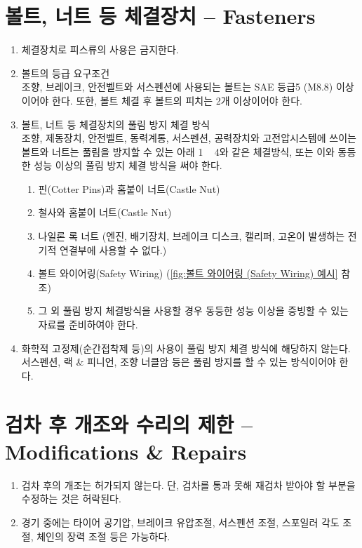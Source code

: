 \documentclass[final,a4paper,10pt]{report}
\begin{document}
\section{볼트, 너트 등 체결장치 – Fasteners} \label{section:체결장치}
\begin{enumerate}
  \item 체결장치로 피스류의 사용은 금지한다.
  \item 볼트의 등급 요구조건\\
    조향, 브레이크, 안전벨트와 서스펜션에 사용되는 볼트는 SAE 등급5 (M8.8) 이상이어야 한다. 또한, 볼트 체결 후 볼트의 피치는 2개 이상이어야 한다.
  \item 볼트, 너트 등 체결장치의 풀림 방지 체결 방식\\ \label{item:체결장치의 풀림 방지}
    조향, 제동장치, 안전벨트, 동력계통, 서스펜션, 공력장치와 고전압시스템에 쓰이는 볼트와 너트는 풀림을 방지할 수 있는 아래 1 \string~ 4와 같은 체결방식, 또는 이와 동등한 성능 이상의 풀림 방지 체결 방식을 써야 한다.
    \begin{enumerate}
      \item 핀(Cotter Pins)과 홈붙이 너트(Castle Nut)
      \item 철사와 홈붙이 너트(Castle Nut)
      \item 나일론 록 너트 (엔진, 배기장치, 브레이크 디스크, 캘리퍼, 고온이 발생하는 전기적 연결부에 사용할 수 없다.)
      \item 볼트 와이어링(Safety Wiring) (\cref{fig:볼트 와이어링 (Safety Wiring) 예시} 참조)
      \item 그 외 풀림 방지 체결방식을 사용할 경우 동등한 성능 이상을 증빙할 수 있는 자료를 준비하여야 한다.
    \end{enumerate}
  \item 화학적 고정제(순간접착제 등)의 사용이 풀림 방지 체결 방식에 해당하지 않는다. 서스펜션, 랙 \& 피니언, 조향 너클암 등은 풀림 방지를 할 수 있는 방식이어야 한다.
\end{enumerate}


\section{검차 후 개조와 수리의 제한 – Modifications \& Repairs}
\begin{enumerate}
  \item 검차 후의 개조는 허가되지 않는다. 단, 검차를 통과 못해 재검차 받아야 할 부분을 수정하는 것은 허락된다.
  \item 경기 중에는 타이어 공기압, 브레이크 유압조절, 서스펜션 조절, 스포일러 각도 조절, 체인의 장력 조절 등은 가능하다.
\end{enumerate}
\end{document}
